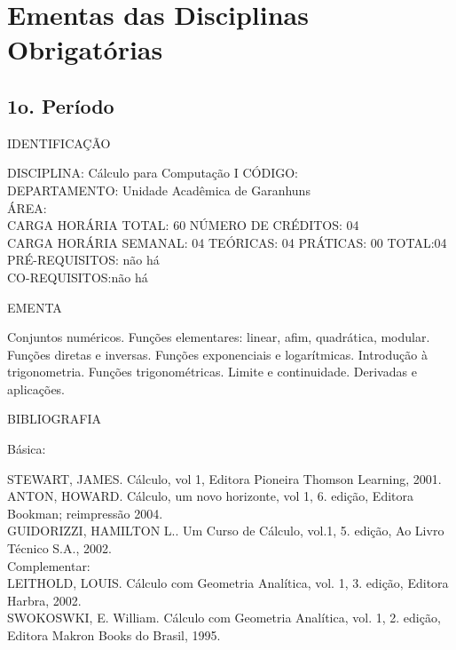 \documentclass[
	12pt,				%
	openright,			%
  oneside,     %
	a4paper,			%
	english,			%
	french,				%
	spanish,			%
	brazil				%
	]{abntex2}
\begin{document}
\begin{apendicesenv}
\begin{landscape}
\begin{longtable}{r|r|l|l|l}
    \end{longtable}%
\end{landscape}




\setlength{\parindent}{0in}
\chapter{Ementas das Disciplinas Obrigatórias}
\section*{1o. Período}

IDENTIFICAÇÃO

DISCIPLINA: Cálculo para Computação I CÓDIGO:\\
DEPARTAMENTO: Unidade Acadêmica de Garanhuns\\
ÁREA:\\
CARGA HORÁRIA TOTAL: 60 NÚMERO DE CRÉDITOS: 04\\
CARGA HORÁRIA SEMANAL: 04 TEÓRICAS: 04 PRÁTICAS: 00 TOTAL:04\\
PRÉ-REQUISITOS: não há\\
CO-REQUISITOS:não há

EMENTA

Conjuntos numéricos. Funções elementares: linear, afim, quadrática,
modular. Funções diretas e inversas. Funções exponenciais e
logarítmicas. Introdução à trigonometria. Funções trigonométricas.
Limite e continuidade. Derivadas e aplicações.

BIBLIOGRAFIA

Básica:

STEWART, JAMES. Cálculo, vol 1, Editora Pioneira Thomson Learning,
2001.\\
ANTON, HOWARD. Cálculo, um novo horizonte, vol 1, 6. edição, Editora
Bookman; reimpressão 2004.\\
GUIDORIZZI, HAMILTON L.. Um Curso de Cálculo, vol.1, 5. edição, Ao Livro
Técnico S.A., 2002.\\
Complementar:\\
LEITHOLD, LOUIS. Cálculo com Geometria Analítica, vol. 1, 3. edição,
Editora Harbra, 2002.\\
SWOKOSWKI, E. William. Cálculo com Geometria Analítica, vol. 1, 2.
edição, Editora Makron Books do Brasil, 1995.\\


\end{apendicesenv}
\end{document}
